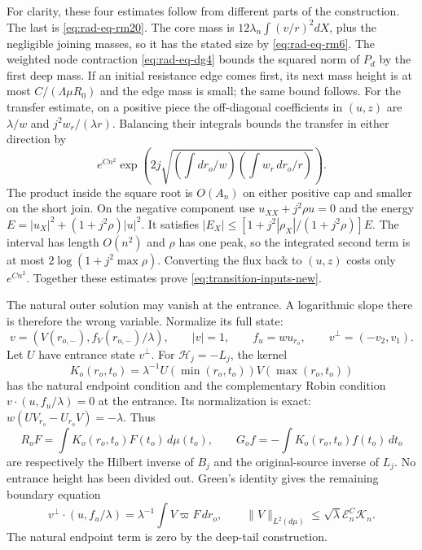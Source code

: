 For clarity, these four estimates follow from different parts of the
construction.  The last is \eqref{eq:rad-eq-rm20}.
The core mass is $12\lambda_n\int(v/r)^2dX$, plus the negligible
joining masses, so it has the stated size by
\eqref{eq:rad-eq-rm6}.  The weighted node contraction
\eqref{eq:rad-eq-dg4} bounds the squared norm of $P_d$ by the first
deep mass.  If an initial resistance edge comes first, its next mass
height is at most $C/(\Lambda\mu R_0)$ and the edge mass is small;
the same bound follows.
For the transfer estimate, on a positive piece the off-diagonal
coefficients in $(u,z)$ are $\lambda/w$ and $j^2w_r/(\lambda r)$.
Balancing their integrals bounds the transfer in either direction by
\[
 e^{Cn^2}\exp\!\left(2j\sqrt{\left(\int dr_o/w\right)
                                  \left(\int w_r\,dr_o/r\right)}\right).
\]
The product inside the square root is $O(A_n)$ on either positive cap
and smaller on the short join.  On the negative component use
$u_{XX}+j^2\rho u=0$ and the energy
$E=|u_X|^2+(1+j^2\rho)|u|^2$.
It satisfies
$|E_X|\le[1+j^2|\rho_X|/(1+j^2\rho)]E$.
The interval has length $O(n^2)$ and $\rho$ has one peak, so the
integrated second term is at most $2\log(1+j^2\max\rho)$.
Converting the flux back to $(u,z)$ costs only $e^{Cn^2}$.
Together these estimates prove \eqref{eq:transition-inputs-new}.

The natural outer solution may vanish at the entrance.  A logarithmic
slope there is therefore the wrong variable.  Normalize its full state:
\begin{equation}\label{eq:rad-eq-tm1}
 v=(V(r_{o,-}),f_V(r_{o,-})/\lambda),\qquad |v|=1,
 \qquad f_u=wu_{r_o},\qquad v^\perp=(-v_2,v_1).
\end{equation}
Let $U$ have entrance state $v^\perp$.  For $\mathscr H_j=-L_j$,
the kernel
\[
 K_o(r_o,t_o)=\lambda^{-1}U(\min(r_o,t_o))V(\max(r_o,t_o))
\]
has the natural endpoint condition and the complementary Robin condition
$v\cdot(u,f_u/\lambda)=0$ at the entrance.  Its normalization is exact:
$w(UV_{r_o}-U_{r_o}V)=-\lambda$.
Thus
\begin{equation}\label{eq:outer-robin-new}
 R_oF=\int K_o(r_o,t_o)F(t_o)\,d\mu(t_o),\qquad
 G_of=-\int K_o(r_o,t_o)f(t_o)\,dt_o
\end{equation}
are respectively the Hilbert inverse of $B_j$ and the original-source
inverse of $L_j$.  No entrance height has been divided out.
Green's identity gives the remaining boundary equation
\begin{equation}\label{eq:rad-eq-tm2}
 v^\perp\cdot(u,f_u/\lambda)
       =\lambda^{-1}\int V\varpi F\,dr_o,
 \qquad \|V\|_{L^2(d\mu)}\le\sqrt\lambda\mathcal E_n^C\mathcal K_n.
\end{equation}
The natural endpoint term is zero by the deep-tail construction.

